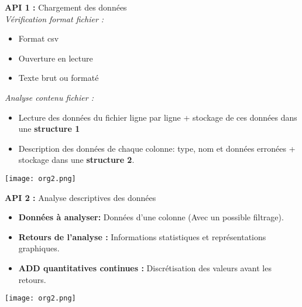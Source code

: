 	\begin{frame}
		\textbf{API 1 :} Chargement des données\\
		\textit{Vérification format fichier :}
		\begin{itemize}
			\item Format csv
			\item Ouverture en lecture
			\item Texte brut ou formaté
		\end{itemize} \pause
		\vspace{1cm}
		\textit{Analyse contenu fichier :}
		\begin{itemize}
			\item Lecture des données du fichier ligne par ligne + stockage de ces données dans une \textbf{structure 1} 
			\item Description des données de chaque colonne: type, nom et données erronées + stockage dans une \textbf{structure 2}.
		\end{itemize}		 		
	\end{frame}
	
	\begin{frame}
		\begin{center}\texttt{[image: org2.png]}\end{center}
	\end{frame}
	
	\begin{frame}
		\textbf{API 2 :} Analyse descriptives des données\\
		\begin{itemize}
			\item \textbf{Données à analyser:} Données d'une colonne (Avec un possible filtrage).
			\item \textbf{Retours de l'analyse :} Informations statistiques et représentations graphiques.
			\item \textbf{ADD quantitatives continues :} Discrétisation des valeurs avant les retours.
		\end{itemize}	
	\end{frame}
	
	\begin{frame}
		\begin{center}\texttt{[image: org2.png]}\end{center}
	\end{frame}
	
